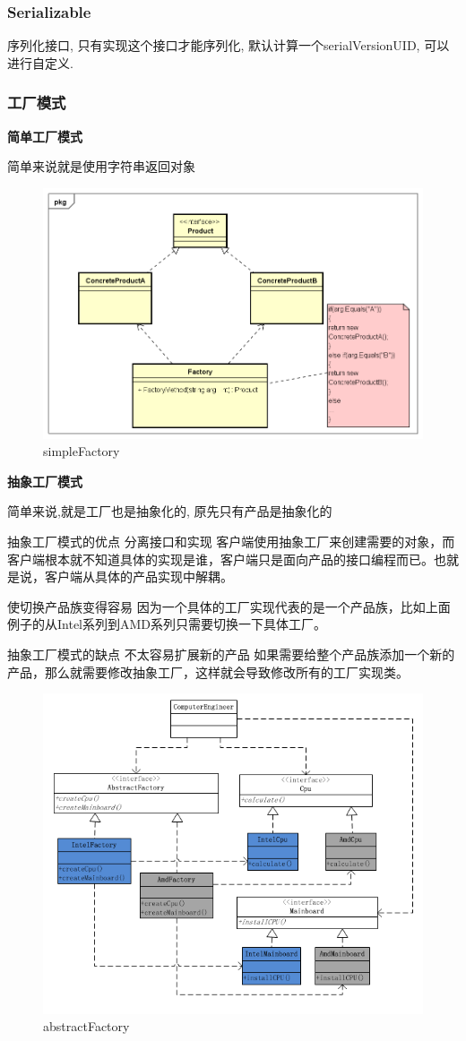 \subsubsection{Serializable}
序列化接口, 只有实现这个接口才能序列化, 默认计算一个serialVersionUID, 可以进行自定义.


\subsubsection{工厂模式}
\textbf{简单工厂模式}

简单来说就是使用字符串返回对象
\begin{figure}
	\centering
	\includegraphics[width=0.7\linewidth]{figures/simpleFactory.png}
	\caption{simpleFactory}
	\label{fig:simpleFactory}
\end{figure}

\textbf{抽象工厂模式}

简单来说,就是工厂也是抽象化的, 原先只有产品是抽象化的

抽象工厂模式的优点
分离接口和实现
客户端使用抽象工厂来创建需要的对象，而客户端根本就不知道具体的实现是谁，客户端只是面向产品的接口编程而已。也就是说，客户端从具体的产品实现中解耦。

使切换产品族变得容易
因为一个具体的工厂实现代表的是一个产品族，比如上面例子的从Intel系列到AMD系列只需要切换一下具体工厂。

抽象工厂模式的缺点
不太容易扩展新的产品
如果需要给整个产品族添加一个新的产品，那么就需要修改抽象工厂，这样就会导致修改所有的工厂实现类。

\begin{figure}
	\centering
	\includegraphics[width=0.7\linewidth]{figures/abstractFactory.png}
	\caption{abstractFactory}
	\label{fig:abstractFactory}
\end{figure}

